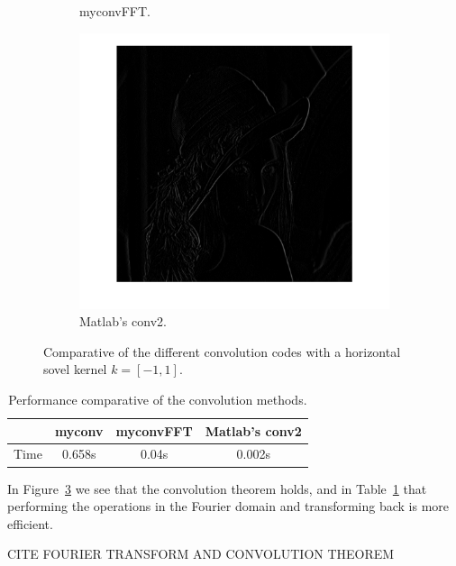 \documentclass[12pt]{article}
\begin{document}
\begin{figure}[htbp]
\begin{subfigure}[b]{0.32\textwidth}
                \caption{myconvFFT.}
                \label{fig:myconvFFT}
        \end{subfigure}
        \begin{subfigure}[b]{0.32\textwidth}
                \includegraphics[width=\textwidth]{images/conv2}
                \caption{Matlab's conv2.}
                \label{fig:conv2}
        \end{subfigure}
        \caption{Comparative of the different convolution codes with a horizontal sovel kernel $k = \left[-1, 1 \right]$.}\label{fig:convolution}
\end{figure}

\begin{table}[h]
	\centering
	\begin{tabular}{|c|c|c|c|}
	\hline
     & myconv & myconvFFT & Matlab's conv2 \\ \hline
	Time & 0.658s   & 0.04s     & 0.002s   \\ \hline
	\end{tabular}
	\caption{Performance comparative of the convolution methods.}
	\label{tb:convolutionPerfomance}
\end{table}
 
In Figure~\ref{fig:convolution} we see that the convolution theorem holds, and in Table~\ref{tb:convolutionPerfomance} that performing the operations in the Fourier domain and transforming back is more efficient.

CITE FOURIER TRANSFORM AND CONVOLUTION THEOREM
\end{document}
